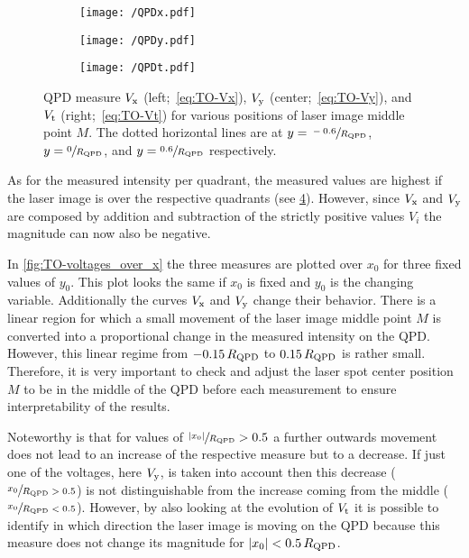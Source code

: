  \begin{figure}
  \centering
  \begin{subfigure}[b]{0.36\textwidth}
    \centering
    \texttt{[image: /QPDx.pdf]}
    \label{fig:TO-QPDx}
  \end{subfigure}
  \hfill
  \begin{subfigure}[b]{0.3\textwidth}
    \centering
    \texttt{[image: /QPDy.pdf]}
    \label{fig:TO-QPDy}
  \end{subfigure}
  \hfill
  \begin{subfigure}[b]{0.3\textwidth}
    \centering
    \texttt{[image: /QPDt.pdf]}
    \label{fig:TO-QPDt}
  \end{subfigure}
  \caption{QPD measure $V_{\mathrm{x}}$ (left;~\cref{eq:TO-Vx}), $V_{\mathrm{y}}$ 
    (center;~\cref{eq:TO-Vy}), and $V_{\mathrm{t}}$ (right;~\cref{eq:TO-Vt}) for 
    various positions of laser image middle point $M$. The dotted horizontal 
    lines are at $y=\sfrac{-0.6}{R_{\mathrm{QPD}}}$, $y=\sfrac{0}{R_{\mathrm{QPD}}}$, 
  and $y=\sfrac{0.6}{R_{\mathrm{QPD}}}$ respectively.}
  \label{fig:TO-QPDs}
 \end{figure}

As for the measured intensity per quadrant, the measured values are highest if 
the laser image is over the respective quadrants (see \cref{fig:TO-QPDs}). 
However, since $V_{\mathrm{x}}$ and $V_{\mathrm{y}}$ are composed by addition and 
subtraction of the strictly positive values $V_{i}$ the magnitude can now also 
be negative.

In \cref{fig:TO-voltages_over_x} the three measures are plotted over $x_{0}$ 
for three fixed values of $y_{0}$. This plot looks the same if $x_{0}$ is fixed 
and $y_{0}$ is the changing variable. Additionally the curves $V_{\mathrm{x}}$ and 
$V_{\mathrm{y}}$ change their behavior. There is a linear region for which a small 
movement of the laser image middle point $M$ is converted into a proportional 
change in the measured intensity on the QPD. However, this linear regime from 
$-0.15\,R_{\mathrm{QPD}}$ to $0.15\,R_{\mathrm{QPD}}$ is rather small. Therefore, it is 
very important to check and adjust the laser spot center position $M$ to be in 
the middle of the QPD before each measurement to ensure interpretability of the 
results.

Noteworthy is that for values of $\sfrac{\abs{x_{0}}}{R_{\mathrm{QPD}}} > 0.5$ a 
further outwards movement does not lead to an increase of the respective 
measure but to a decrease. If just one of the voltages, here $V_{\mathrm{y}}$, is 
taken into account then this decrease ($\sfrac{x_{0}}{R_{\mathrm{QPD}} > 0.5}$) is 
not distinguishable from the increase coming from the middle 
($\sfrac{x_{0}}{R_{\mathrm{QPD}} < 0.5}$). However, by also looking at the 
evolution of $V_{\mathrm{t}}$ it is possible to identify in which direction the 
laser image is moving on the QPD because this measure does not change its 
magnitude for $\abs{x_{0}} < 0.5\,R_{\mathrm{QPD}} $.

